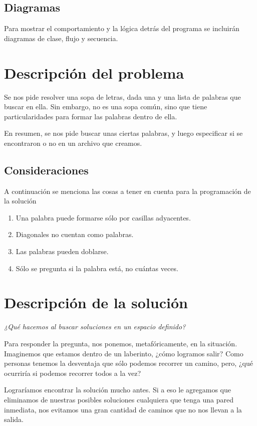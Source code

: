 \documentclass{article}
\begin{document}
    \subsection{Diagramas}
    Para mostrar el comportamiento y la lógica detrás del programa se incluirán
    diagramas de clase, flujo y secuencia.



  \section{Descripción del problema}

    Se nos pide resolver una sopa de letras, dada una y una lista de palabras que
    buscar en ella. Sin embargo, no es una sopa común, sino que tiene particularidades
    para formar las palabras dentro de ella.

    En resumen, se nos pide buscar unas ciertas palabras, y luego especificar si
    se encontraron o no en un archivo que creamos.

    \subsection{Consideraciones}
      A continuación se menciona las cosas a tener en cuenta para la programación
      de la solución
    \begin{enumerate}
      \item Una palabra puede formarse sólo por casillas adyacentes.
      \item Diagonales no cuentan como palabras.
      \item Las palabras pueden doblarse.
      \item Sólo se pregunta si la palabra está, no cuántas veces.
    \end{enumerate}



  \section{Descripción de la solución}
    \textit{¿Qué hacemos al buscar soluciones en un espacio definido?}

    Para responder la pregunta, nos ponemos, metafóricamente, en la situación.
    Imaginemos que estamos dentro de un laberinto, ¿cómo logramos salir? Como
    personas tenemos la desventaja que sólo podemos recorrer un camino, pero,
    ¿qué ocurriría si podemos recorrer todos a la vez?

    Lograríamos encontrar la solución mucho antes. Si a eso le agregamos que
    eliminamos de nuestras posibles soluciones cualquiera que tenga una pared inmediata,
    nos evitamos una gran cantidad de caminos que no nos llevan a la salida.
\end{document}
